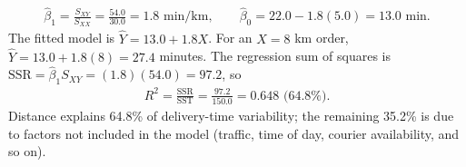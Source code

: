 \begin{solproblema}[prob:58d3723]
\begin{align}
\hat\beta_1=\frac{S_{XY}}{S_{XX}}=\frac{54.0}{30.0}=1.8\text{ min/km},\qquad \hat\beta_0=22.0-1.8(5.0)=13.0\text{ min}.
\end{align}
The fitted model is $\hat Y=13.0+1.8X$. For an $X=8$ km order, $\hat Y=13.0+1.8(8)=27.4$ minutes. The regression sum of squares is $\text{SSR}=\hat\beta_1S_{XY}=(1.8)(54.0)=97.2$, so
\begin{align}
R^2=\frac{\text{SSR}}{\text{SST}}=\frac{97.2}{150.0}=0.648\text{ (64.8\%).}
\end{align}
Distance explains 64.8\% of delivery-time variability; the remaining 35.2\% is due to factors not included in the model (traffic, time of day, courier availability, and so on).
\end{solproblema}
